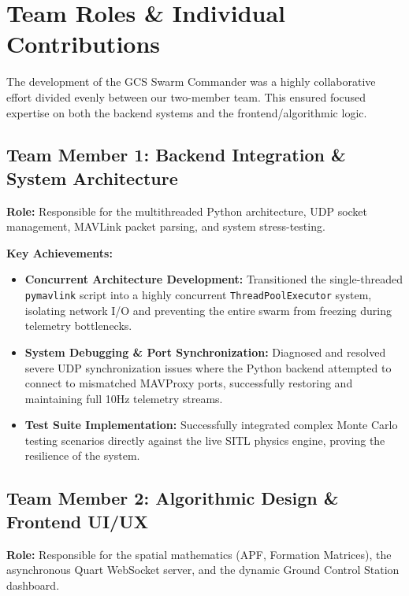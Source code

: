 \documentclass[11pt,a4paper]{article}
\newcommand{\code}[1]{\lstinline[basicstyle=\ttfamily\small,columns=fullflexible]|#1|}
\begin{document}
\section{Team Roles \& Individual Contributions}

The development of the GCS Swarm Commander was a highly collaborative effort divided evenly between our two-member team. This ensured focused expertise on both the backend systems and the frontend/algorithmic logic.

\subsection{Team Member 1: Backend Integration \& System Architecture}
\textbf{Role:} Responsible for the multithreaded Python architecture, UDP socket management, MAVLink packet parsing, and system stress-testing.

\textbf{Key Achievements:}
\begin{itemize}[leftmargin=1.5em]
    \item \textbf{Concurrent Architecture Development:} Transitioned the single-threaded \code{pymavlink} script into a highly concurrent \code{ThreadPoolExecutor} system, isolating network I/O and preventing the entire swarm from freezing during telemetry bottlenecks.
    \item \textbf{System Debugging \& Port Synchronization:} Diagnosed and resolved severe UDP synchronization issues where the Python backend attempted to connect to mismatched MAVProxy ports, successfully restoring and maintaining full 10Hz telemetry streams.
    \item \textbf{Test Suite Implementation:} Successfully integrated complex Monte Carlo testing scenarios directly against the live SITL physics engine, proving the resilience of the system.
\end{itemize}

\subsection{Team Member 2: Algorithmic Design \& Frontend UI/UX}
\textbf{Role:} Responsible for the spatial mathematics (APF, Formation Matrices), the asynchronous Quart WebSocket server, and the dynamic Ground Control Station dashboard.
\end{document}
